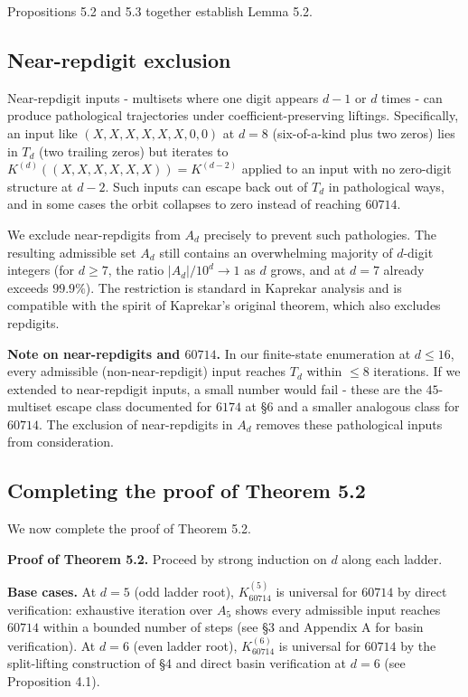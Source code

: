 \documentclass[11pt,letterpaper]{article}
\theoremstyle{paperstyle}
\theoremstyle{paperstyledef}
\theoremstyle{paperstylerem}
\begin{document}
Propositions 5.2 and 5.3 together establish Lemma 5.2.

\hypertarget{near-repdigit-exclusion}{%
\subsection{Near-repdigit exclusion}\label{near-repdigit-exclusion}}

Near-repdigit inputs - multisets where one digit appears \(d - 1\) or
\(d\) times - can produce pathological trajectories under
coefficient-preserving liftings. Specifically, an input like
\((X, X, X, X, X, X, 0, 0)\) at \(d = 8\) (six-of-a-kind plus two zeros)
lies in \(T_d\) (two trailing zeros) but iterates to
\(K^{(d)}((X, X, X, X, X, X)) = K^{(d-2)}\) applied to an input with no
zero-digit structure at \(d - 2\). Such inputs can escape back out of
\(T_d\) in pathological ways, and in some cases the orbit collapses to
zero instead of reaching \(60714\).

We exclude near-repdigits from \(A_d\) precisely to prevent such
pathologies. The resulting admissible set \(A_d\) still contains an
overwhelming majority of \(d\)-digit integers (for \(d \geq 7\), the
ratio \(|A_d| / 10^d \to 1\) as \(d\) grows, and at \(d = 7\) already
exceeds \(99.9\%\)). The restriction is standard in Kaprekar analysis
and is compatible with the spirit of Kaprekar's original theorem, which
also excludes repdigits.

\textbf{Note on near-repdigits and \(60714\).} In our finite-state
enumeration at \(d \leq 16\), every admissible (non-near-repdigit) input
reaches \(T_d\) within \(\leq 8\) iterations. If we extended to
near-repdigit inputs, a small number would fail - these are the
\(45\)-multiset escape class documented for \(6174\) at §6 and a smaller
analogous class for \(60714\). The exclusion of near-repdigits in
\(A_d\) removes these pathological inputs from consideration.

\hypertarget{completing-the-proof-of-theorem-5.2}{%
\subsection{Completing the proof of Theorem 5.2}\label{completing-the-proof-of-theorem-5.2}}

We now complete the proof of Theorem 5.2.

\textbf{Proof of Theorem 5.2.} Proceed by strong induction on \(d\)
along each ladder.

\textbf{Base cases.} At \(d = 5\) (odd ladder root), \(K_{60714}^{(5)}\)
is universal for \(60714\) by direct verification: exhaustive iteration
over \(A_5\) shows every admissible input reaches \(60714\) within a
bounded number of steps (see §3 and Appendix A for basin verification).
At \(d = 6\) (even ladder root), \(K_{60714}^{(6)}\) is universal for
\(60714\) by the split-lifting construction of §4 and direct basin
verification at \(d = 6\) (see Proposition 4.1).
\end{document}

